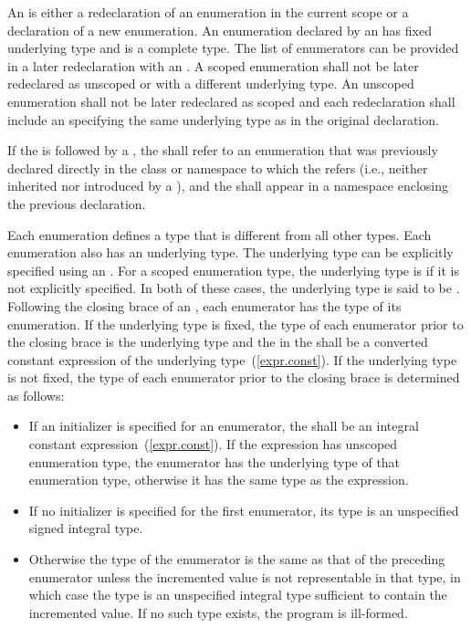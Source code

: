 \pnum
An  is either a redeclaration
of an enumeration in the current scope or a declaration of a new enumeration.
\enternote An enumeration declared by an
 has fixed underlying type and is a
complete type. The list of enumerators can be provided in a later redeclaration
with an . \exitnote A scoped enumeration
shall not be later redeclared as unscoped or with a different underlying type.
An unscoped enumeration shall not be later redeclared as scoped and each
redeclaration shall include an  specifying the same
underlying type as in the original declaration.

\pnum
If the  is followed by a
, the  shall
refer to an enumeration that was previously declared directly in the class or
namespace to which the  refers (i.e., neither
inherited nor introduced by a ), and the
 shall appear in a namespace enclosing the previous
declaration.

\pnum
{}%
%
Each enumeration defines a type that is different from all other types.
Each enumeration also has an underlying type.
The underlying type can be explicitly specified using an .
For a scoped enumeration type, the underlying type is  if it is not
explicitly specified. In both of these cases, the underlying type is said to be
.
Following the closing brace of an , each
enumerator has the type of its enumeration.
If the underlying type is fixed, the type of each enumerator
prior to the closing brace is the underlying
type
and the  in the 
shall be a converted constant expression of the underlying
type~(\ref{expr.const}).
If the underlying
type is not fixed,
the type of each enumerator prior to the closing brace is determined as
follows:

\begin{itemize}
\item If an
initializer is specified for an enumerator, the
 shall be an integral constant
expression~(\ref{expr.const}). If the expression has
unscoped enumeration type, the enumerator has the underlying type of that
enumeration type, otherwise it has the same type as the expression.

\item If no initializer is specified for the
first enumerator, its type is an unspecified signed integral type.

\item  Otherwise
the type of the enumerator is the same as that of the
preceding enumerator unless the incremented value is not representable
in that type, in which case the type is an unspecified integral type
sufficient to contain the incremented value. If no such type exists, the program
is ill-formed.
\end{itemize}

